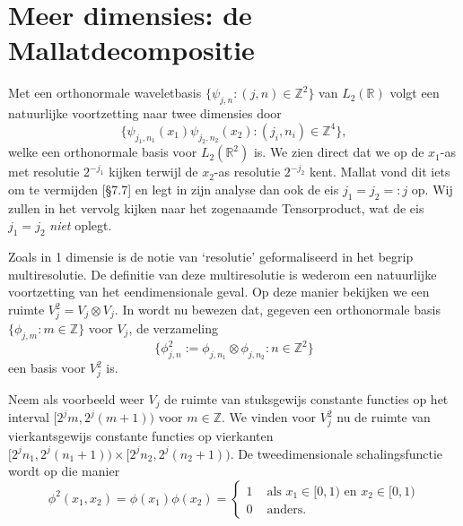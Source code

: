 \documentclass[11pt]{report}
\theoremstyle{plain}
\theoremstyle{definition}
\theoremstyle{remark}
\newcommand{\R}{\mathbb{R}}
\newcommand{\Z}{\mathbb{Z}}
\begin{document}
\section{Meer dimensies: de Mallatdecompositie}
Met een orthonormale waveletbasis $\{ \psi_{j,n}: (j,n) \in \Z^2\}$ van $L_2(\R)$ volgt een natuurlijke voortzetting naar twee dimensies door
\[
  \{ \psi_{j_1,n_1}(x_1) \psi_{j_2,n_2}(x_2): (j_i,n_i) \in \Z^4 \},
\]
welke een orthonormale basis voor $L_2(\R^2)$ is. We zien direct dat we op de $x_1$-as met resolutie $2^{-j_1}$ kijken terwijl de $x_2$-as resolutie $2^{-j_2}$ kent. Mallat vond dit iets om te vermijden \cite{mallat}[\S 7.7] en legt in zijn analyse dan ook de eis $j_1 = j_2 =: j$ op. Wij zullen in het vervolg kijken naar het zogenaamde Tensorproduct, wat de eis $j_1 = j_2$ \emph{niet} oplegt.

Zoals in 1 dimensie is de notie van `resolutie' geformaliseerd in het begrip multiresolutie. De definitie van deze multiresolutie is wederom een natuurlijke voortzetting van het eendimensionale geval. Op deze manier bekijken we een ruimte $V_j^2 = V_j \otimes V_j$. In \cite[\S 7.7]{mallat} wordt nu bewezen dat, gegeven een orthonormale basis $\{ \phi_{j,m}: m \in \Z \}$ voor $V_j$, de verzameling
\[
	\{ \phi^2_{j,n} := \phi_{j,n_1} \otimes \phi_{j,n_2}: n \in \Z^2 \}
\]
een basis voor $V_j^2$ is.

Neem als voorbeeld weer $V_j$ de ruimte van stuksgewijs constante functies op het interval $[2^j m, 2^j(m+1) )$ voor $m \in \Z$. We vinden voor $V_j^2$ nu de ruimte van vierkantsgewijs constante functies op vierkanten $[2^jn_1, 2^j(n_1+1)) \times [2^jn_2, 2^j(n_2+1))$. De tweedimensionale schalingsfunctie wordt op die manier
\[
	\phi^2(x_1,x_2) = \phi(x_1)\phi(x_2) = \begin{cases} 1 & \text{ als } x_1 \in [0,1)\text{ en }x_2 \in [0,1) \\ 0 & \text{ anders.} \end{cases}
\]
\end{document}
